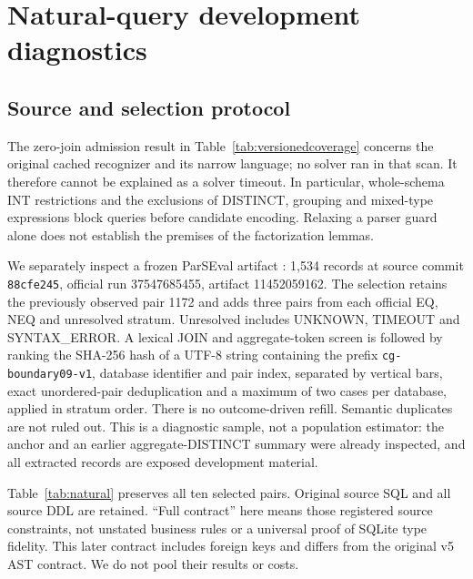\section{Natural-query development diagnostics}\label{sec:natural}
\subsection{Source and selection protocol}
The zero-join admission result in Table~\ref{tab:versionedcoverage} concerns the original cached recognizer and its narrow language; no solver ran in that scan. It therefore cannot be explained as a solver timeout. In particular, whole-schema INT restrictions and the exclusions of DISTINCT, grouping and mixed-type expressions block queries before candidate encoding. Relaxing a parser guard alone does not establish the premises of the factorization lemmas.

We separately inspect a frozen ParSEval artifact \citep{chen2025parseval}: 1,534 records at source commit \texttt{88cfe245}, official run 37547685455, artifact 11452059162. The selection retains the previously observed pair 1172 and adds three pairs from each official EQ, NEQ and unresolved stratum. Unresolved includes UNKNOWN, TIMEOUT and SYNTAX\_ERROR. A lexical JOIN and aggregate-token screen is followed by ranking the SHA-256 hash of a UTF-8 string containing the prefix \texttt{cg-boundary09-v1}, database identifier and pair index, separated by vertical bars, exact unordered-pair deduplication and a maximum of two cases per database, applied in stratum order. There is no outcome-driven refill. Semantic duplicates are not ruled out. This is a diagnostic sample, not a population estimator: the anchor and an earlier aggregate-DISTINCT summary were already inspected, and all extracted records are exposed development material.

Table~\ref{tab:natural} preserves all ten selected pairs. Original source SQL and all source DDL are retained. ``Full contract'' here means those registered source constraints, not unstated business rules or a universal proof of SQLite type fidelity. This later contract includes foreign keys and differs from the original v5 AST contract. We do not pool their results or costs.

